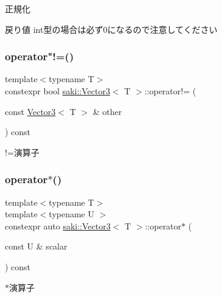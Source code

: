 正規化 

\begin{DoxyReturn}{戻り値}
int型の場合は必ず0になるので注意してください 
\end{DoxyReturn}
\mbox{\label{classsaki_1_1_vector3_aaaf161e4fc7f76aeee0d074efd411748}} 
\subsubsection{\texorpdfstring{operator"!=()}{operator!=()}}
{\footnotesize\ttfamily template$<$typename T$>$ \\
constexpr bool \mbox{\hyperlink{classsaki_1_1_vector3}{saki\+::\+Vector3}}$<$ T $>$\+::operator!= (\begin{DoxyParamCaption}\item[{const \mbox{\hyperlink{classsaki_1_1_vector3}{Vector3}}$<$ T $>$ \&}]{other }\end{DoxyParamCaption}) const\hspace{0.3cm}{\ttfamily [inline]}}



!=演算子 

\mbox{\label{classsaki_1_1_vector3_a5136a5b7f840d84ecce85a760d17bf6f}} 
\subsubsection{\texorpdfstring{operator$\ast$()}{operator*()}}
{\footnotesize\ttfamily template$<$typename T$>$ \\
template$<$typename U $>$ \\
constexpr auto \mbox{\hyperlink{classsaki_1_1_vector3}{saki\+::\+Vector3}}$<$ T $>$\+::operator$\ast$ (\begin{DoxyParamCaption}\item[{const U \&}]{scalar }\end{DoxyParamCaption}) const\hspace{0.3cm}{\ttfamily [inline]}}



$\ast$演算子 

\mbox{\label{classsaki_1_1_vector3_a207b4651058144d0f57deee0fbd3387a}} 
